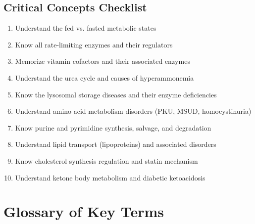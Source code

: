 \subsection{Critical Concepts Checklist}

\begin{enumerate}
    \item[$\square$] Understand the fed vs. fasted metabolic states
    \item[$\square$] Know all rate-limiting enzymes and their regulators
    \item[$\square$] Memorize vitamin cofactors and their associated enzymes
    \item[$\square$] Understand the urea cycle and causes of hyperammonemia
    \item[$\square$] Know the lysosomal storage diseases and their enzyme deficiencies
    \item[$\square$] Understand amino acid metabolism disorders (PKU, MSUD, homocystinuria)
    \item[$\square$] Know purine and pyrimidine synthesis, salvage, and degradation
    \item[$\square$] Understand lipid transport (lipoproteins) and associated disorders
    \item[$\square$] Know cholesterol synthesis regulation and statin mechanism
    \item[$\square$] Understand ketone body metabolism and diabetic ketoacidosis
\end{enumerate}


\section{Glossary of Key Terms}

